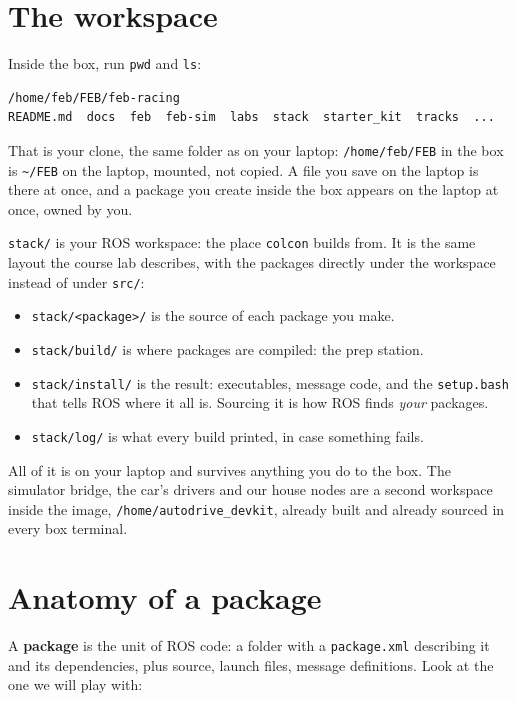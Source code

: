 \documentclass[11pt,a4paper]{article}
\begin{document}
\section{The workspace}

Inside the box, run \texttt{pwd} and \texttt{ls}:

\begin{lstlisting}
/home/feb/FEB/feb-racing
README.md  docs  feb  feb-sim  labs  stack  starter_kit  tracks  ...
\end{lstlisting}

That is your clone, the same folder as on your laptop: \texttt{/home/feb/FEB} in the box is
\texttt{\textasciitilde/FEB} on the laptop, mounted, not copied. A file you save on the laptop is
there at once, and a package you create inside the box appears on the laptop at once, owned by
you.

\texttt{stack/} is your ROS workspace: the place \texttt{colcon} builds from. It is the same
layout the course lab describes, with the packages directly under the workspace instead of
under \texttt{src/}:

\begin{itemize}
  \item \texttt{stack/<package>/} is the source of each package you make.
  \item \texttt{stack/build/} is where packages are compiled: the prep station.
  \item \texttt{stack/install/} is the result: executables, message code, and the \texttt{setup.bash}
  that tells ROS where it all is. Sourcing it is how ROS finds \emph{your} packages.
  \item \texttt{stack/log/} is what every build printed, in case something fails.
\end{itemize}

All of it is on your laptop and survives anything you do to the box. The simulator bridge, the
car's drivers and our house nodes are a second workspace inside the image,
\texttt{/home/autodrive\_devkit}, already built and already sourced in every box terminal.

\section{Anatomy of a package}

A \textbf{package} is the unit of ROS code: a folder with a \texttt{package.xml} describing it
and its dependencies, plus source, launch files, message definitions. Look at the one we will
play with:
\end{document}
